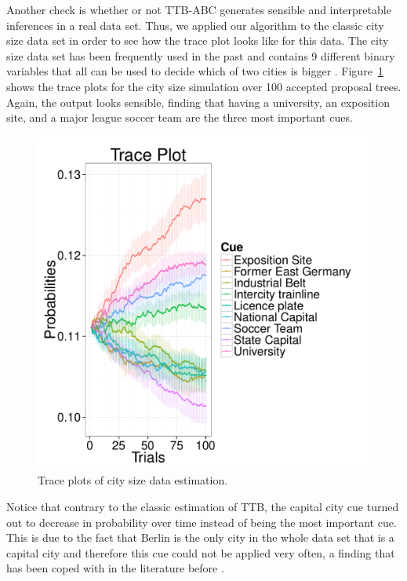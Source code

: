 \documentclass[a4paper,man, natbib]{apa6}
\begin{document}
Another check is whether or not TTB-ABC generates sensible and interpretable inferences in a real data set. Thus, we applied our algorithm to the classic city size data set in order to see how the trace plot looks like for this data. The city size data set has been frequently used in the past and contains 9 different binary variables that all can be used to decide which of two cities is bigger \citep{chater2003fast, gigerenzer2009homo}. Figure~\ref{fig:citytrace} shows the trace plots for the city size simulation over 100 accepted proposal trees. Again, the output looks sensible, finding that having a university, an exposition site, and a major league soccer team are the three most important cues.

\begin{figure}[htb!]
  \caption{Trace plots of city size data estimation.}
\label{fig:citytrace}
  \centering
    \includegraphics[scale=0.5]{figs/citytrace.pdf}
\end{figure}

Notice that contrary to the classic estimation of TTB, the capital city cue turned out to decrease in probability over time instead of being the most important cue. This is due to the fact that Berlin is the only city in the whole data set that is a capital city and therefore this cue could not be applied very often, a finding that has been coped with in the literature before \citep{broder2012quest}.
\end{document}
